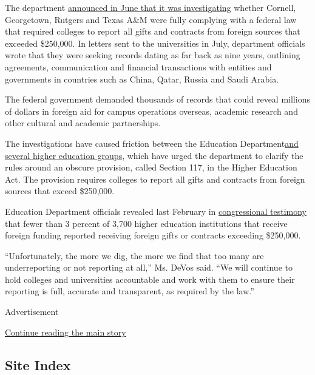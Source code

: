 The department
\href{https://s3.amazonaws.com/public-inspection.federalregister.gov/2019-13904.pdf?utm_source=federalregister.gov\&utm_medium=email\&utm_campaign=pi+subscription+mailing+list}{announced
in June that it was investigating} whether Cornell, Georgetown, Rutgers
and Texas A\&M were fully complying with a federal law that required
colleges to report all gifts and contracts from foreign sources that
exceeded \$250,000. In letters sent to the universities in July,
department officials wrote that they were seeking records dating as far
back as nine years, outlining agreements, communication and financial
transactions with entities and governments in countries such as China,
Qatar, Russia and Saudi Arabia.

The federal government demanded thousands of records that could reveal
millions of dollars in foreign aid for campus operations overseas,
academic research and other cultural and academic partnerships.

The investigations have caused friction between the Education
Department\href{https://www.acenet.edu/Documents/Letter-ED-Associations-Response-on-Section-117.pdf}{and
several higher education groups}, which have urged the department to
clarify the rules around an obscure provision, called Section 117, in
the Higher Education Act. The provision requires colleges to report all
gifts and contracts from foreign sources that exceed \$250,000.

Education Department officials revealed last February in
\href{https://www.hsgac.senate.gov/imo/media/doc/2019-02-28\%20Zais\%20Testimony\%20-\%20PSI.pdf}{congressional
testimony} that fewer than 3 percent of 3,700 higher education
institutions that receive foreign funding reported receiving foreign
gifts or contracts exceeding \$250,000.

``Unfortunately, the more we dig, the more we find that too many are
underreporting or not reporting at all,'' Ms. DeVos said. ``We will
continue to hold colleges and universities accountable and work with
them to ensure their reporting is full, accurate and transparent, as
required by the law.''

Advertisement

\protect\hyperlink{after-bottom}{Continue reading the main story}

\hypertarget{site-index}{%
\subsection{Site Index}\label{site-index}}

